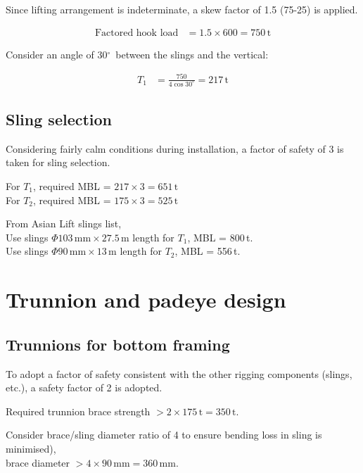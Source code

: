 \documentclass[a4paper,10pt]{article}
\renewcommand{\deg}{$^\circ$}
\begin{document}
Since lifting arrangement is indeterminate, a skew factor of 1.5 
(75-25) is applied.

\begin{align*}
\text{Factored hook load} &= 1.5 \times 600 = 750\,\mathrm{t}
\end{align*}

Consider an angle of 30\deg\ between the slings and the vertical:

\begin{align*}
T_1 &= \frac{750}{4 \cos{30^\circ}} = 217\,\mathrm{t}
\end{align*}



\subsection*{Sling selection}
Considering fairly calm conditions during installation, a factor of safety of
3 is taken for sling selection.

For $T_1$, required MBL = $217 \times 3 = 651\,\mathrm{t}$ \\
For $T_2$, required MBL = $175 \times 3 = 525\,\mathrm{t}$

From Asian Lift slings list, \\
Use slings $\Phi 103\,\mathrm{mm} \times 27.5\,\mathrm{m}$ length for 
$T_1$, MBL = 800\,t. \\
Use slings $\Phi 90\,\mathrm{mm} \times 13\,\mathrm{m}$ length for 
$T_2$, MBL = 556\,t.



\addtocounter{section}{1}
\section{Trunnion and padeye design}
\subsection*{Trunnions for bottom framing}
To adopt a factor of safety consistent with the other rigging components
(slings, etc.), a safety factor of 2 is adopted.

Required trunnion brace strength $> 2 \times 175\,\mathrm{t} = 350\,\mathrm{t}$.

Consider brace/sling diameter ratio of 4 to ensure bending loss in sling is 
minimised), \\
brace diameter $> 4 \times 90\,\mathrm{mm} = 360\,\mathrm{mm}$. 
\end{document}
